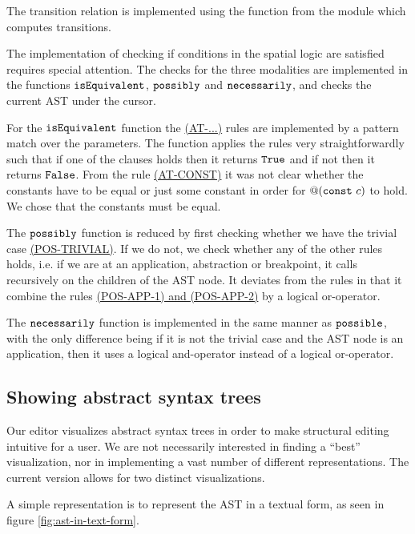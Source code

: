 The transition relation is implemented using the  function from the
 module which computes transitions.

The implementation of checking if conditions in the spatial logic are
satisfied requires special attention. The checks for the three
modalities are implemented in the functions $\texttt{isEquivalent}$,
$\texttt{possibly}$ and $\texttt{necessarily}$, and checks the current AST
under the cursor.

For the $\texttt{isEquivalent}$ function the
\hyperref[fig:conditionreductionrules]{(AT-...)} rules are implemented by a
pattern match over the parameters. The function applies the rules very
straightforwardly such that if one of the clauses holds then it returns
$\texttt{True}$ and if not then it returns $\texttt{False}$. From the rule
\hyperref[fig:conditionreductionrules]{(AT-CONST)} it was not clear whether the
constants have to be equal or just some constant in order for $@(\texttt{const}~c)$
to hold. We chose that the constants must be equal.

The $\texttt{possibly}$ function is reduced by first checking whether we have the
trivial case \hyperref[fig:conditionreductionrules]{(POS-TRIVIAL)}. If we do
not, we check whether any of the other rules holds, i.e. if we are at an
application, abstraction or breakpoint, it calls recursively on the children of
the AST node. It deviates from the rules in that it combine the rules
\hyperref[fig:conditionreductionrules]{(POS-APP-1) and (POS-APP-2)} by a logical
or-operator.

The $\texttt{necessarily}$ function is implemented in the same manner as
$\texttt{possible}$, with the only difference being if it is not the trivial case
and the AST node is an application, then it uses a logical and-operator instead
of a logical or-operator.


\subsection{Showing abstract syntax trees}

Our editor visualizes abstract syntax trees in order to make
structural editing intuitive for a user.  We are not necessarily
interested in finding a ``best'' visualization, nor in implementing a
vast number of different representations. The current version allows
for two distinct visualizations.

A simple representation is to represent the AST in a textual form,
as seen in figure \ref{fig:ast-in-text-form}.

